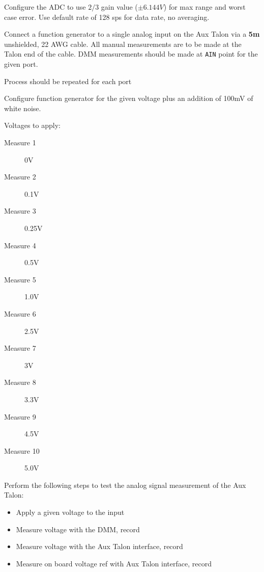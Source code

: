 Configure the ADC to use $2/3$ gain value ($\pm 6.144V$) for max range and worst case error. Use default rate of 128 sps for data rate, no averaging. 

Connect a function generator to a single analog input on the Aux Talon via a \textbf{5m} unshielded, 22 AWG cable. All manual measurements are to be made at the Talon end of the cable. DMM measurements should be made at \texttt{AIN} point for the given port.

Process should be repeated for each port 

Configure function generator for the given voltage plus an addition of 100mV of white noise. 

Voltages to apply:
\begin{description}
\item [Measure 1] 0V
\item [Measure 2] 0.1V
\item [Measure 3] 0.25V
\item [Measure 4] 0.5V
\item [Measure 5] 1.0V
\item [Measure 6] 2.5V
\item [Measure 7] 3V
\item [Measure 8] 3.3V
\item [Measure 9] 4.5V
\item [Measure 10] 5.0V
\end{description}

Perform the following steps to test the analog signal measurement of the Aux Talon:
\begin{itemize}
\item Apply a given voltage to the input
\item Measure voltage with the DMM, record 
\item Measure voltage with the Aux Talon interface, record 
\item Measure on board voltage ref with Aux Talon interface, record 

\end{itemize}

